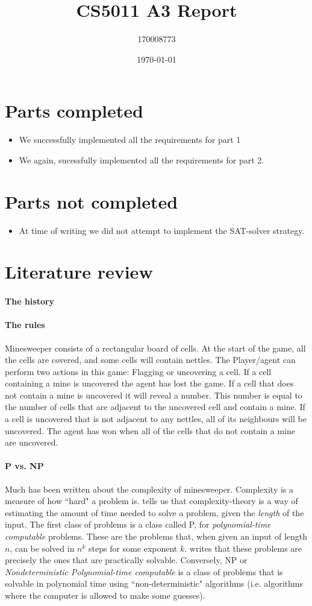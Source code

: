 \documentclass[british]{article}
\title{CS5011 A3 Report}
\author{170008773}
\date{\today}
\begin{document}
\maketitle
\section{Parts completed}
\label{completed}
\begin{itemize}
\item We successfully implemented all the requirements for part 1
\item We again, sucessfully implemented all the requirements for part 2.
\end{itemize}
\section{Parts not completed}
\label{uncompleted}
\begin{itemize}
\item At time of writing we did not attempt to implement the SAT-solver strategy.
\end{itemize}
\section{Literature review}
\label{litrev}
\paragraph{The history}
\paragraph{The rules} Minesweeper consists of a rectangular board of cells. At the start of the game, all the cells are covered, and some cells will contain nettles. The Player/agent can perform two actions in this game: Flagging or uncovering a cell. If a cell containing a mine is uncovered the agent has lost the game. If a cell that does not contain a mine is uncovered it will reveal a number. This number is equal to the number of cells that are adjacent to the uncovered cell and contain a mine. If a cell is uncovered that is not adjacent to any nettles, all of its neighbours will be uncovered. The agent has won when all of the cells that do not contain a mine are uncovered.
\paragraph{P vs. NP} Much has been written about the complexity of minesweeper. Complexity is a measure of how ``hard" a problem is. \cite{Kaye00} tells us that complexity-theory is a way of estimating the amount of time needed to solve a problem, given the \textit{length} of the input. The first class of problems is a class called P, for \textit{polynomial-time computable} problems. These are the problems that, when given an input of length $n$, can be solved in $n^k$ steps for some exponent $k$. \citeauthor{Kaye00} writes that these problems are precisely the ones that are practically solvable. Conversely, NP or \textit{Nondeterministic Polynomial-time computable} is a class of problems that is solvable in polynomial time using ``non-deterministic" algorithms (i.e. algorithms where the computer is allowed to make some guesses). 
\end{document}
